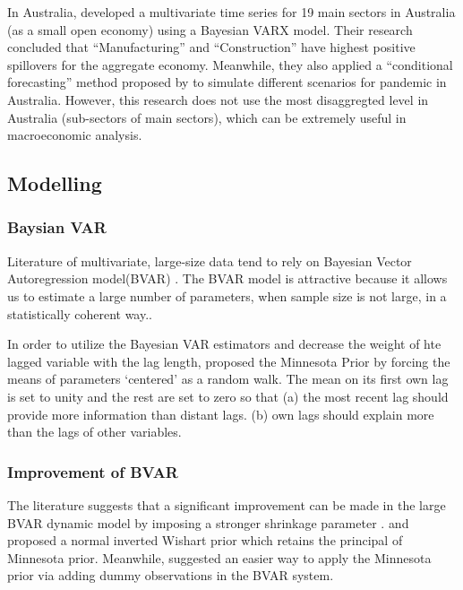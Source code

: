 \documentclass[11pt,a4paper,]{article}
\begin{document}
In Australia, \textcite{anderson2020} developed a multivariate time series for 19 main sectors in Australia (as a small open economy) using a Bayesian VARX model. Their research concluded that ``Manufacturing'' and ``Construction'' have highest positive spillovers for the aggregate economy. Meanwhile, they also applied a ``conditional forecasting'' method proposed by \textcite{waggoner1999} to simulate different scenarios for pandemic in Australia. However, this research does not use the most disaggregted level in Australia (sub-sectors of main sectors), which can be extremely useful in macroeconomic analysis.

\hypertarget{modelling}{%
\subsection{Modelling}\label{modelling}}

\hypertarget{baysian-var}{%
\subsubsection{Baysian VAR}\label{baysian-var}}

Literature of multivariate, large-size data tend to rely on Bayesian Vector Autoregression model(BVAR) \autocites[e.g.][]{anderson2020,litterman1986,banbura2010large}. The BVAR model is attractive because it allows us to estimate a large number of parameters, when sample size is not large, in a statistically coherent way.\autocite{litterman1986,wozniak2016bayesian}.

In order to utilize the Bayesian VAR estimators and decrease the weight of hte lagged variable with the lag length, \textcite{litterman1979} proposed the Minnesota Prior by forcing the means of parameters `centered' as a random walk. The mean on its first own lag is set to unity and the rest are set to zero so that (a) the most recent lag should provide more information than distant lags. (b) own lags should explain more than the lags of other variables.

\hypertarget{improvement-of-bvar}{%
\subsubsection{Improvement of BVAR}\label{improvement-of-bvar}}

The literature suggests that a significant improvement can be made in the large BVAR dynamic model by imposing a stronger shrinkage parameter \autocite{banbura2010large,litterman1986}. \textcite{robertson1999vector} and \textcite{kadiyala1997} proposed a normal inverted Wishart prior which retains the principal of Minnesota prior. Meanwhile, \textcite{banbura2010large} suggested an easier way to apply the Minnesota prior via adding dummy observations in the BVAR system.
\end{document}
